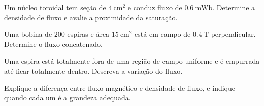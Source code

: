 \begin{questao}[2]{}

Um núcleo toroidal tem seção de $\SI{4}{\centi\meter\squared}$ e conduz fluxo
de $\SI{0.6}{\milli\weber}$. Determine a densidade de fluxo e avalie a
proximidade da saturação.


\end{questao}
\begin{questao}[2]{}

Uma bobina de $200$ espiras e área $\SI{15}{\centi\meter\squared}$ está em
campo de $\SI{0.4}{\tesla}$ perpendicular. Determine o fluxo concatenado.


\end{questao}
\begin{questao}[2]{}

Uma espira está totalmente fora de uma região de campo uniforme e é empurrada
até ficar totalmente dentro. Descreva a variação do fluxo.


\end{questao}
\begin{questao}[2]{}

Explique a diferença entre fluxo magnético e densidade de fluxo, e indique
quando cada um é a grandeza adequada.


\end{questao}

